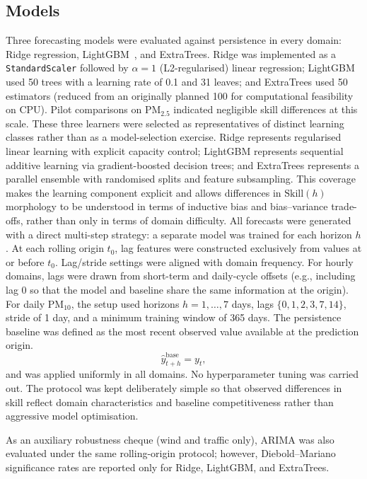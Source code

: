 \documentclass[pdflatex,sn-mathphys]{sn-jnl}
\begin{document}
\subsection{Models}
Three forecasting models were evaluated against persistence in every domain: Ridge regression, LightGBM~\citep{ke2017lightgbm}, and ExtraTrees. Ridge was implemented as a \texttt{StandardScaler} followed by $\alpha=1$ (L2-regularised) linear regression; LightGBM used 50 trees with a learning rate of 0.1 and 31 leaves; and ExtraTrees used 50 estimators (reduced from an originally planned 100 for computational feasibility on CPU). Pilot comparisons on PM$_{2.5}$ indicated negligible skill differences at this scale.
These three learners were selected as representatives of distinct learning classes rather than as a model-selection exercise. Ridge represents regularised linear learning with explicit capacity control; LightGBM represents sequential additive learning via gradient-boosted decision trees; and ExtraTrees represents a parallel ensemble with randomised splits and feature subsampling. This coverage makes the learning component explicit and allows differences in $\mathrm{Skill}(h)$ morphology to be understood in terms of inductive bias and bias--variance trade-offs, rather than only in terms of domain difficulty.
All forecasts were generated with a direct multi-step strategy: a separate model was trained for each horizon $h$. At each rolling origin $t_0$, lag features were constructed exclusively from values at or before $t_0$.
Lag/stride settings were aligned with domain frequency. For hourly domains, lags were drawn from short-term and daily-cycle offsets (e.g., including lag 0 so that the model and baseline share the same information at the origin). For daily PM$_{10}$, the setup used horizons $h=1,\ldots,7$ days, lags $\{0,1,2,3,7,14\}$, stride of 1 day, and a minimum training window of 365 days.
The persistence baseline was defined as the most recent observed value available at the prediction origin.
\begin{equation}
\hat{y}^{\mathrm{base}}_{t+h} = y_{t},
\end{equation}
and was applied uniformly in all domains.
No hyperparameter tuning was carried out. The protocol was kept deliberately simple so that observed differences in skill reflect domain characteristics and baseline competitiveness rather than aggressive model optimisation.

As an auxiliary robustness cheque (wind and traffic only), ARIMA was also evaluated under the same rolling-origin protocol; however, Diebold–Mariano significance rates are reported only for Ridge, LightGBM, and ExtraTrees.
\end{document}
